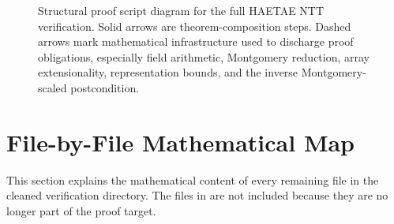 \documentclass[11pt]{article}
\newcommand{\ec}[1]{\texttt{\detokenize{#1}}}
\begin{document}
\begin{figure}[p]
\caption{Structural proof script diagram for the full HAETAE NTT
verification.  Solid arrows are theorem-composition steps.  Dashed arrows mark
mathematical infrastructure used to discharge proof obligations, especially
field arithmetic, Montgomery reduction, array extensionality, representation
bounds, and the inverse Montgomery-scaled postcondition.}
\label{fig:haetae-ntt-proof-structure}
\end{figure}

\section{File-by-File Mathematical Map}

This section explains the mathematical content of every remaining \ec{.ec}
file in the cleaned verification directory.  The files in \ec{rubbish/} are
not included because they are no longer part of the proof target.
\end{document}
